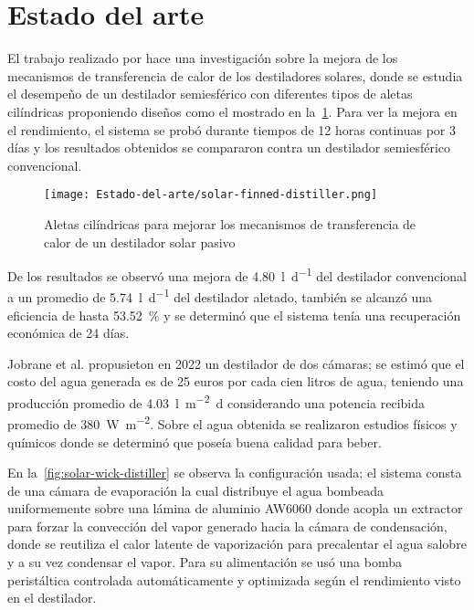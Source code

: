 \section{Estado del arte}
	
	El trabajo realizado por \cite{kabeel_performance_2022} hace una investigación sobre la mejora de los mecanismos de transferencia de calor de los destiladores solares, donde se estudia el desempeño de un destilador semiesférico con diferentes tipos de aletas cilíndricas proponiendo diseños como el mostrado en la~\cref{fig:solar-finned-distiller}. Para ver la mejora en el rendimiento, el sistema se probó durante tiempos de 12 horas continuas por 3 días y los resultados obtenidos se compararon contra un destilador semiesférico convencional. 	
		
	\begin{figure}[H]
		\centering
		\texttt{[image: Estado-del-arte/solar-finned-distiller.png]}
		\caption{Aletas cilíndricas para mejorar los mecanismos de transferencia de calor de un destilador solar pasivo}
		\label{fig:solar-finned-distiller}
	\end{figure}
	
	De los resultados se observó una mejora de \SI{4.80}{\litre\per\day} del destilador convencional a un promedio de \SI{5.74}{\litre\per\day} del destilador aletado, también se alcanzó una eficiencia de hasta \qty{53.52}{\percent} y se determinó que el sistema tenía una recuperación económica de 24 días.
	
	Jobrane et al. \cite{jobrane_theoretical_2022} propusieton en 2022 un destilador de dos cámaras; se estimó que el costo del agua generada es de 25 euros por cada cien litros de agua, teniendo una producción promedio de \SI{4.03}{\litre\per\m\tothe{2}\day} considerando una potencia recibida promedio de \SI{380}{\watt\per\m\tothe{2}}. Sobre el agua obtenida se realizaron estudios físicos y químicos donde se determinó que poseía buena calidad para beber.
	
	En la~\cref{fig:solar-wick-distiller} se observa la configuración usada; el sistema consta de una cámara de evaporación la cual distribuye el agua bombeada uniformemente sobre una lámina de aluminio AW6060 donde acopla un extractor para forzar la convección del vapor generado hacia la cámara de condensación, donde se reutiliza el calor latente de vaporización para precalentar el agua salobre y a su vez condensar el vapor. Para su alimentación se usó una bomba peristáltica controlada automáticamente y optimizada según el rendimiento visto en el destilador.
	
